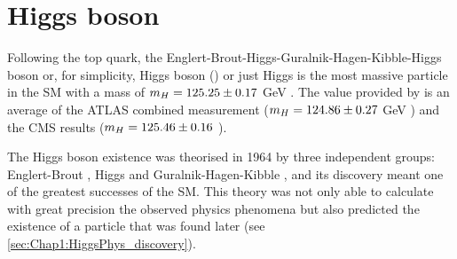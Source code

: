 \begin{comment}
For the charged weak current only the only the left-handed top couples to the \PWpm with coupling. This is done
via the \Wtb vertex with a strength of $g\gamma^{\mu}(1-\gamma^{5})V_{tb}$ (Figures \ref{fig:Chap1:top:decay:TopQuarkDecay} 
and \ref{fig:Chap1:TopPhys:Couplings:W}). The value of $V_{tb}$ is given in Table \ref{tab:Chap1:CKM}.
The top couples to the \PZ bosons (Figure \ref{fig:Chap1:TopPhys:Couplings:Z})with unequal left and right-handed components, 
$\frac{ig}{2\textrm{cos}\,\theta_{W}}\gamma^{\mu}(v_{t}-a_{t}\gamma^{5})$. Being $v_{t} =1/2 -2Q_{t} \textrm{sin}^{2}\theta_{W}$ 
and $a_{t} = 1/2$.
Finally, for the Higgs boson (Figure \ref{fig:Chap1:TopPhys:Couplings:H}), the top quark couples with a Yukawa type interaction $\bar{\Psi}\Psi \phi$ with a strength $\yt = \frac{\sqrt{2}\mtop}{v}$, as Equation \ref{eq:chap1:HiggsMechanism:YukawaCoupling} states. 
All of these couplings are flavour-conserving, with the exception of the charged-current
interaction with the \PW bosons. 

\end{comment}


\section{Higgs boson}
\label{sec:Chap1:HiggsBoson}
Following the top quark, the Englert-Brout-Higgs-Guralnik-Hagen-Kibble-Higgs boson or, for simplicity, Higgs boson (\PH) or just Higgs
is the most massive particle in the SM with a mass of
$m_{H} = 125.25 \pm 0.17$ GeV \cite{pdgHiggs}. The value provided by \cite{pdgHiggs} is an average
of the ATLAS combined measurement ($m_{H} = 124.86 \pm 0.27$ GeV
\cite{ATLAS:2018tdk}) and the CMS results ($m_{H} = 125.46 \pm 0.16$ \cite{CMS:2020xrn}). %

The Higgs boson existence was theorised in 1964 by three independent groups: Englert-Brout \cite{PhysRevLett.13.321},  
Higgs \cite{PhysRevLett.13.508} and Guralnik-Hagen-Kibble \cite{PhysRevLett.13.585}, and its discovery meant one of the greatest successes of the SM. This theory
was not only able to calculate with great precision the 
observed physics phenomena but also predicted the existence of a particle 
that was found later (see \ref{sec:Chap1:HiggsPhys_discovery}).

